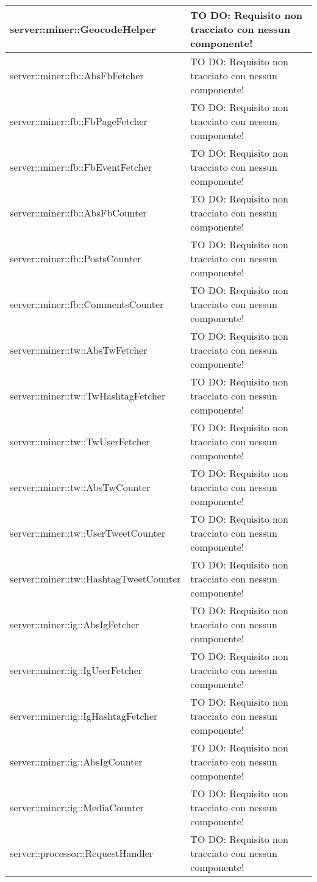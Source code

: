 \begin{center}
\begin{longtable}{| p{11cm} | p{2.5cm} |}
\hline
server::miner::GeocodeHelper & TO DO: Requisito non tracciato con nessun componente! \\
\hline
server::miner::fb::AbsFbFetcher & TO DO: Requisito non tracciato con nessun componente! \\
\hline
server::miner::fb::FbPageFetcher & TO DO: Requisito non tracciato con nessun componente! \\
\hline
server::miner::fb::FbEventFetcher & TO DO: Requisito non tracciato con nessun componente! \\
\hline
server::miner::fb::AbsFbCounter & TO DO: Requisito non tracciato con nessun componente! \\
\hline
server::miner::fb::PostsCounter & TO DO: Requisito non tracciato con nessun componente! \\
\hline
server::miner::fb::CommentsCounter & TO DO: Requisito non tracciato con nessun componente! \\
\hline
server::miner::tw::AbsTwFetcher & TO DO: Requisito non tracciato con nessun componente! \\
\hline
server::miner::tw::TwHashtagFetcher & TO DO: Requisito non tracciato con nessun componente! \\
\hline
server::miner::tw::TwUserFetcher & TO DO: Requisito non tracciato con nessun componente! \\
\hline
server::miner::tw::AbsTwCounter & TO DO: Requisito non tracciato con nessun componente! \\
\hline
server::miner::tw::UserTweetCounter & TO DO: Requisito non tracciato con nessun componente! \\
\hline
server::miner::tw::HashtagTweetCounter & TO DO: Requisito non tracciato con nessun componente! \\
\hline
server::miner::ig::AbsIgFetcher & TO DO: Requisito non tracciato con nessun componente! \\
\hline
server::miner::ig::IgUserFetcher & TO DO: Requisito non tracciato con nessun componente! \\
\hline
server::miner::ig::IgHashtagFetcher & TO DO: Requisito non tracciato con nessun componente! \\
\hline
server::miner::ig::AbsIgCounter & TO DO: Requisito non tracciato con nessun componente! \\
\hline
server::miner::ig::MediaCounter & TO DO: Requisito non tracciato con nessun componente! \\
\hline
server::processor::RequestHandler & TO DO: Requisito non tracciato con nessun componente! \\

\end{longtable}
\end{center}
